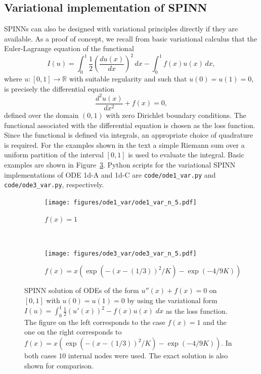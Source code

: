 \documentclass[12pt]{article}
\begin{document}
\subsection{Variational implementation of SPINN}
SPINNs can also be designed with variational principles directly if they are available. As a proof of concept, we recall from basic variational calculus that the Euler-Lagrange equation of the functional
\begin{displaymath}
I(u) = \int_0^1 \frac{1}{2} \left(\frac{du(x)}{dx}\right)^2 \, dx - \int_0^1 f(x) u(x) \, dx,
\end{displaymath}
where $u:[0,1]\to\mathbb{R}$ with suitable regularity and such that $u(0) = u(1) = 0$, is precisely the differential equation
\begin{displaymath}
\frac{d^2u (x)}{dx^2} + f(x) = 0,
\end{displaymath}
defined over the domain $(0,1)$ with zero Dirichlet boundary conditions. The functional associated with the differential equation is chosen as the loss function. Since the functional is defined via integrals, an appropriate choice of quadrature is required. For the examples shown in the text a simple Riemann sum over a uniform partition of the interval $[0,1]$ is used to evaluate the integral. Basic examples are shown in Figure~\ref{fig:var_spinn_1d}. Python scripts for the variational SPINN implementations of ODE 1d-A and 1d-C are  \verb|code/ode1_var.py| and \verb|code/ode3_var.py|, respectively.

\begin{figure}
\begin{subfigure}{0.5\textwidth}
\texttt{[image: figures/ode1\_var/ode1\_var\_n\_5.pdf]}
\caption{$f(x) = 1$}
\label{var_spinn_1d_basic}
\end{subfigure}
~
\begin{subfigure}{0.5\textwidth}
\texttt{[image: figures/ode3\_var/ode3\_var\_n\_5.pdf]}
\caption{$f(x) = x(\exp (-(x - (1/3))^2/K) - \exp (-4/9K))$}
\label{var_spinn_1d_bump}
\end{subfigure}
\caption{SPINN solution of ODEs of the form $u''(x) + f(x) = 0$ on $[0,1]$ with $u(0) = u(1) = 0$ by using the variational form $I(u) = \int_0^1 \frac{1}{2}(u'(x))^2 - f(x)u(x) \; dx$ as the loss function. The figure on the left corresponds to the case $f(x) = 1$ and the one on the right corresponds to $f(x) = x(\exp (-(x - (1/3))^2/K) - \exp (-4/9K))$. In both cases $10$ internal nodes were used. The exact solution is also shown for comparison.}
\label{fig:var_spinn_1d}
\end{figure}
\end{document}
